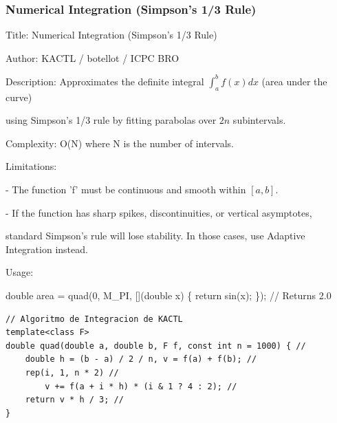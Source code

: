 \documentclass[10pt,landscape,twocolumn]{article}
\begin{document}
\subsubsection{Numerical Integration (Simpson's 1/3 Rule)}
\begin{flushleft}
\footnotesize\ttfamily
\par\noindent Title: Numerical Integration (Simpson's 1/3 Rule)
\par\noindent Author: KACTL / botellot / ICPC BRO
\par\noindent Description: Approximates the definite integral $\int_{a}^{b} f(x) dx$ (area under the curve)
\par\noindent using Simpson's 1/3 rule by fitting parabolas over $2n$ subintervals.
\par\noindent Complexity: O(N) where N is the number of intervals.
\par\noindent Limitations:
\par\noindent - The function 'f' must be continuous and smooth within $[a, b]$.
\par\noindent - If the function has sharp spikes, discontinuities, or vertical asymptotes,
\par\noindent standard Simpson's rule will lose stability. In those cases, use Adaptive Integration instead.
\par\noindent Usage:
\par\noindent double area = quad(0, M\_PI, [](double x) \{ return sin(x); \}); // Returns 2.0
\end{flushleft}

\begin{lstlisting}
// Algoritmo de Integracion de KACTL
template<class F>
double quad(double a, double b, F f, const int n = 1000) { //
    double h = (b - a) / 2 / n, v = f(a) + f(b); //
    rep(i, 1, n * 2) //
        v += f(a + i * h) * (i & 1 ? 4 : 2); //
    return v * h / 3; //
}
\end{lstlisting}
\end{document}
